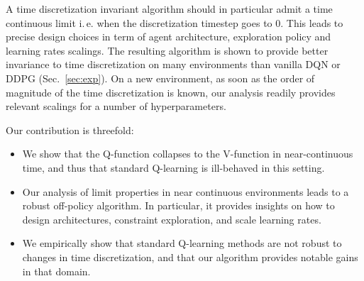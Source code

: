A time discretization invariant algorithm should in particular admit a time
continuous limit i.\,e. when the discretization timestep goes to $0$.  This
leads to precise design choices in term of agent architecture, exploration
policy and learning rates scalings.  The resulting algorithm is shown to
provide better invariance to time discretization on many environments than
vanilla DQN or DDPG (Sec.~\ref{sec:exp}).  On a new environment, as soon as the
order of magnitude of the time discretization is known, our analysis readily
provides relevant scalings for a number of hyperparameters.


Our contribution is threefold:
\begin{itemize} 
\item We show that the Q-function collapses to the V-function in near-continuous time, and thus that
    standard Q-learning is ill-behaved in this setting.
  \item Our analysis of limit properties in near continuous environments leads to a robust off-policy algorithm. In particular,
    it provides insights on how to design architectures, constraint exploration, and scale learning rates.
  \item We empirically show that standard Q-learning methods are not robust to changes in time discretization, and that our algorithm provides notable gains in that domain.
\end{itemize}



